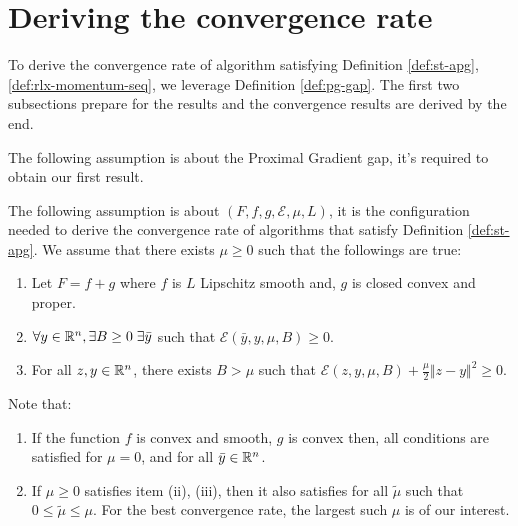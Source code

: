 \documentclass[12pt]{article}
\begin{document}
\section{Deriving the convergence rate}
    To derive the convergence rate of algorithm satisfying Definition \ref{def:st-apg}, \ref{def:rlx-momentum-seq}, we leverage Definition \ref{def:pg-gap}. 
    The first two subsections prepare for the results and the convergence results are derived by the end. 
    \par
    The following assumption is about the Proximal Gradient gap, it's required to obtain our first result. 
    \begin{assumption}\label{ass:for-cnvg}
        The following assumption is about $(F, f, g, \mathcal E, \mu, L)$, it is the configuration needed to derive the convergence rate of algorithms that satisfy Definition \ref{def:st-apg}. 
        We assume that there exists $\mu \ge 0$ such that the followings are true: 
        \begin{enumerate}[nosep]
            \item Let $F = f + g$ where $f$ is $L$ Lipschitz smooth and, $g$ is closed convex and proper.
            \item $\forall y \in \mathbb R^n, \exists B \ge 0\; \exists \bar y$ such that $\mathcal E(\bar y, y, \mu, B) \ge 0$. 
            \item For all $z, y \in \mathbb R^n$, there exists $B > \mu$ such that $\mathcal E(z, y, \mu, B) + \frac{\mu}{2}\Vert z - y\Vert^2 \ge 0$.   
        \end{enumerate}
    \end{assumption}
    \begin{remark}
        Note that:
        \begin{enumerate}
            \item If the function $f$ is convex and smooth, $g$ is convex then, all conditions are satisfied for $\mu = 0$, and for all $\bar y \in \mathbb R^n$. 
            \item If $\mu \ge 0$ satisfies item (ii), (iii), then it also satisfies for all $\tilde \mu$ such that $0 \le \tilde \mu \le \mu$. For the best convergence rate, the largest such $\mu$ is of our interest. 
        \end{enumerate}
        
        
    \end{remark}
\end{document}

